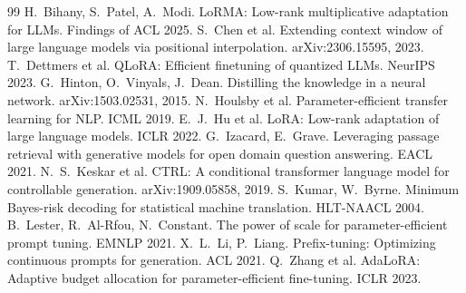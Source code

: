 \documentclass[11pt,a4paper]{article}
\begin{document}
\begin{thebibliography}{99}\small
{} H.~Bihany, S.~Patel, A.~Modi. LoRMA: Low-rank multiplicative adaptation for LLMs. Findings of ACL 2025.
 S.~Chen et al. Extending context window of large language models via positional interpolation. arXiv:2306.15595, 2023.
 T.~Dettmers et al. QLoRA: Efficient finetuning of quantized LLMs. NeurIPS 2023.
 G.~Hinton, O.~Vinyals, J.~Dean. Distilling the knowledge in a neural network. arXiv:1503.02531, 2015.
 N.~Houlsby et al. Parameter-efficient transfer learning for NLP. ICML 2019.
 E.~J.~Hu et al. LoRA: Low-rank adaptation of large language models. ICLR 2022.
 G.~Izacard, E.~Grave. Leveraging passage retrieval with generative models for open domain question answering. EACL 2021.
 N.~S.~Keskar et al. CTRL: A conditional transformer language model for controllable generation. arXiv:1909.05858, 2019.
 S.~Kumar, W.~Byrne. Minimum Bayes-risk decoding for statistical machine translation. HLT-NAACL 2004.
 B.~Lester, R.~Al-Rfou, N.~Constant. The power of scale for parameter-efficient prompt tuning. EMNLP 2021.
 X.~L.~Li, P.~Liang. Prefix-tuning: Optimizing continuous prompts for generation. ACL 2021.
 Q.~Zhang et al. AdaLoRA: Adaptive budget allocation for parameter-efficient fine-tuning. ICLR 2023.
\end{thebibliography}
\end{document}
